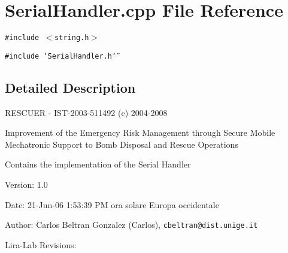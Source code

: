 \section{Serial\-Handler.cpp File Reference}
\label{SerialHandler_8cpp}
{\tt \#include $<$string.h$>$}\par
{\tt \#include \char`\"{}Serial\-Handler.h\char`\"{}}\par


\subsection{Detailed Description}
RESCUER - IST-2003-511492 (c) 2004-2008

Improvement of the Emergency Risk Management through Secure Mobile Mechatronic Support to Bomb Disposal and Rescue Operations

Contains the implementation of the Serial Handler \begin{Desc}
\item[Version:]1.0 \end{Desc}
\begin{Desc}
\item[Date:]21-Jun-06 1:53:39 PM ora solare Europa occidentale \end{Desc}
\begin{Desc}
\item[Author:]Carlos Beltran Gonzalez (Carlos), {\tt cbeltran@dist.unige.it} 

Lira-Lab Revisions:\end{Desc}
